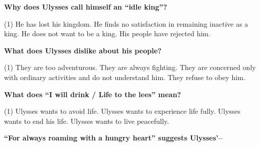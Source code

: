 \documentclass[12pt,a4paper]{exam}
\begin{document}
\begin{questions}

	\setcounter{question}{20}


	\begin{minipage}{\textwidth}
		\question \textbf{Why does Ulysses call himself an ``idle king''?}

		\begin{tasks}(1)
			\task He has lost his kingdom.
			\task He finds no satisfaction in remaining inactive as a king.
			\task He does not want to be a king.
			\task His people have rejected him.
		\end{tasks}
	\end{minipage}


	\begin{minipage}{\textwidth}
		\question \textbf{What does Ulysses dislike about his people?}

		\begin{tasks}(1)
			\task They are too adventurous.
			\task They are always fighting.
			\task They are concerned only with ordinary activities and do not understand him.
			\task They refuse to obey him.
		\end{tasks}
	\end{minipage}


	\begin{minipage}{\textwidth}
		\question \textbf{What does ``I will drink / Life to the lees'' mean?}

		\begin{tasks}(1)
			\task Ulysses wants to avoid life.
			\task Ulysses wants to experience life fully.
			\task Ulysses wants to end his life.
			\task Ulysses wants to live peacefully.
		\end{tasks}
	\end{minipage}


	\begin{minipage}{\textwidth}
		\question \textbf{``For always roaming with a hungry heart'' suggests Ulysses'--}


\end{minipage}
\end{questions}
\end{document}
